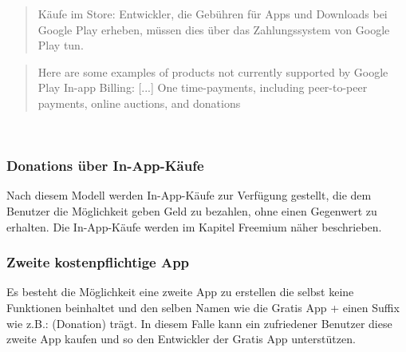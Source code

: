 \documentclass[FIPLY_base.tex]{subfiles}
\begin{document}
\begin{quote}
Käufe im Store: Entwickler, die Gebühren für Apps und Downloads bei Google Play erheben, müssen dies über das Zahlungssystem von Google Play tun.
\end{quote}\cite{gpDevContentPolicy} 

\begin{quote}
Here are some examples of products not currently supported by Google Play In-app Billing: [...]
One time-payments, including peer-to-peer payments, online auctions, and donations
\end{quote}\cite{gpInAppBilling} 

\ \\
\subsubsection{Donations über In-App-Käufe}
Nach diesem Modell werden In-App-Käufe zur Verfügung gestellt, die dem Benutzer die Möglichkeit geben Geld zu bezahlen, ohne einen Gegenwert zu erhalten.
Die In-App-Käufe werden im Kapitel Freemium näher beschrieben.
\ \\
\subsubsection{Zweite kostenpflichtige App}
Es besteht die Möglichkeit eine zweite App zu erstellen die selbst keine Funktionen beinhaltet und den selben Namen wie die Gratis App + einen Suffix wie z.B.: (Donation) trägt.
In diesem Falle kann ein zufriedener Benutzer diese zweite App kaufen und so den Entwickler der Gratis App unterstützen.
\end{document}
